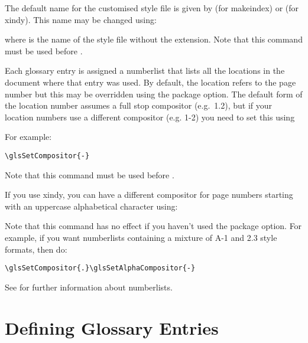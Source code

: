 \documentclass{nlctdoc}
\begin{document}
The default name for the customised style file is given by
 (for \gls{makeindex}) or 
 (for \gls{xindy}). This name may be
changed using:
\begin{definition}[\DescribeMacro{\setStyleFile}]
\end{definition}
where  is the name of the style file without the 
extension. Note that this command must be used before
.

Each glossary entry is assigned a \gls{numberlist} that lists all 
the locations in the document where that entry was used. By default,
the location refers to the page number but this may be overridden
using the  package option. The default form of
the location number assumes a full stop compositor (e.g.\ 1.2),
but if your location numbers use a different compositor (e.g. 1-2)
you need to set this using
\begin{definition}[\DescribeMacro{\glsSetCompositor}]
\end{definition}
For example:
\begin{verbatim}
\glsSetCompositor{-}
\end{verbatim}
Note that this command must be used before .

If you use \gls{xindy}, you can have a different compositor for page
numbers starting with an uppercase alphabetical character using:
\begin{definition}[\DescribeMacro{\glsSetAlphaCompositor}]
\end{definition}
Note that this command has no effect if you haven't used the
 package option. For example, if you want 
\glspl{numberlist} containing a mixture of A-1 and 2.3 style
formats, then do:
\begin{verbatim}
\glsSetCompositor{.}\glsSetAlphaCompositor{-}
\end{verbatim}
See  for further information about
\glspl{numberlist}.

\section{Defining Glossary Entries}
\label{sec:newglosentry}
\end{document}
